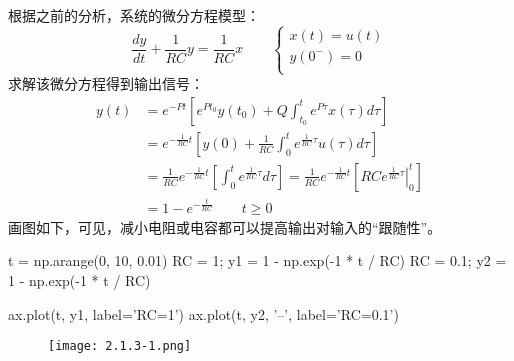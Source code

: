 根据之前的分析，系统的微分方程模型：
\[
\frac{dy}{dt}+\frac{1}{RC}y=\frac{1}{RC}x \qquad \begin{cases}
	x\left( t \right) =u\left( t \right)\\
	y\left( 0^- \right) =0\\
\end{cases}
\]
求解该微分方程得到输出信号：
\begin{align*}
y\left( t \right) &=e^{-Pt}\left[ e^{Pt_0}y\left( t_0 \right) +Q\int_{t_0}^t{e^{P\tau}x\left( \tau \right) d\tau} \right] \\
&=e^{-\frac{1}{RC}t}\left[ y\left( 0 \right) +\frac{1}{RC}\int_0^t{e^{\frac{1}{RC}\tau}u\left( \tau \right) d\tau} \right] \\
&=\frac{1}{RC}e^{-\frac{1}{RC}t}\left[ \int_0^t{e^{\frac{1}{RC}\tau}d\tau} \right] =\frac{1}{RC}e^{-\frac{1}{RC}t}\left[ \left. RCe^{\frac{1}{RC}\tau} \right|_{0}^{t} \right] \\
&=1-e^{-\frac{t}{RC}} \qquad t\geqslant 0
\end{align*}
画图如下，可见，减小电阻或电容都可以提高输出对输入的“跟随性”。

\begin{python}
t  = np.arange(0, 10, 0.01)
RC = 1;   y1 = 1 - np.exp(-1 * t / RC)
RC = 0.1; y2 = 1 - np.exp(-1 * t / RC)

ax.plot(t, y1,       label='RC=1')
ax.plot(t, y2, '--', label='RC=0.1')
\end{python}

\begin{figure}[h]
\centering
\texttt{[image: 2.1.3-1.png]}
\end{figure}





